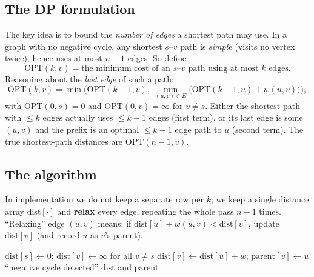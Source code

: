 \documentclass[11pt]{article}
\begin{document}
\subsection{The DP formulation}

The key idea is to bound the \emph{number of edges} a shortest path may use. In a graph
with no negative cycle, any shortest $s$--$v$ path is \emph{simple} (visits no vertex
twice), hence uses at most $n-1$ edges. So define
\[
\mathrm{OPT}(k, v) = \text{the minimum cost of an $s$--$v$ path using at most $k$ edges.}
\]
Reasoning about the \emph{last edge} of such a path:
\[
\mathrm{OPT}(k, v) = \min\Big( \mathrm{OPT}(k-1, v),\ \min_{(u,v)\in E}\big(\mathrm{OPT}(k-1,u) + w(u,v)\big) \Big),
\]
with $\mathrm{OPT}(0, s) = 0$ and $\mathrm{OPT}(0, v) = \infty$ for $v \ne s$. Either the
shortest path with $\le k$ edges actually uses $\le k-1$ edges (first term), or its last
edge is some $(u,v)$ and the prefix is an optimal $\le k-1$ edge path to $u$ (second term).
The true shortest-path distances are $\mathrm{OPT}(n-1, v)$.

\subsection{The algorithm}

In implementation we do not keep a separate row per $k$; we keep a single distance array
$\mathrm{dist}[\cdot]$ and \textbf{relax} every edge, repeating the whole pass $n-1$ times.
``Relaxing'' edge $(u,v)$ means: if $\mathrm{dist}[u] + w(u,v) < \mathrm{dist}[v]$, update
$\mathrm{dist}[v]$ (and record $u$ as $v$'s parent).

\begin{algorithm}[h]
\caption{Bellman--Ford (single-source shortest paths)}
\begin{algorithmic}[1]
\State $\mathrm{dist}[s] \gets 0$; \quad $\mathrm{dist}[v] \gets \infty$ for all $v \ne s$
            \State $\mathrm{dist}[v] \gets \mathrm{dist}[u] + w$; \quad $\mathrm{parent}[v] \gets u$
        \EndIf
    \EndFor
\EndFor
\State {}
        \State \Return ``negative cycle detected''
    \EndIf
\EndFor
\State \Return $\mathrm{dist}$ and $\mathrm{parent}$
\end{algorithmic}
\end{algorithm}
\end{document}
